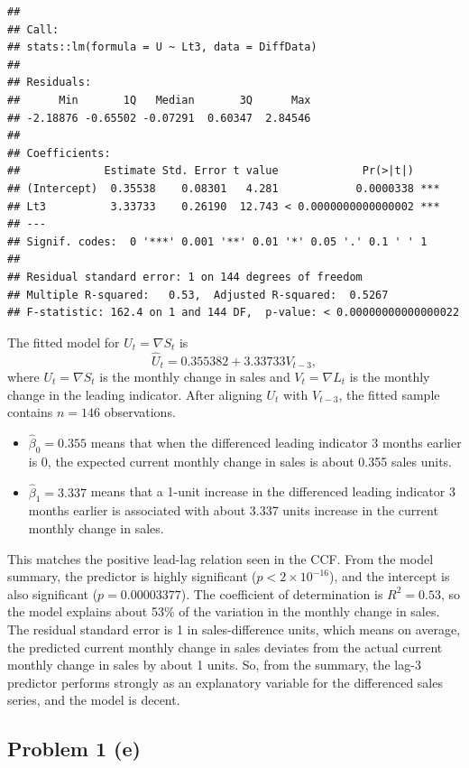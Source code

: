 \documentclass[
  10pt,
]{extarticle}
\providecommand{\tightlist}{%
  \setlength{\itemsep}{0pt}\setlength{\parskip}{0pt}}
\begin{document}
\begin{verbatim}
## 
## Call:
## stats::lm(formula = U ~ Lt3, data = DiffData)
## 
## Residuals:
##      Min       1Q   Median       3Q      Max 
## -2.18876 -0.65502 -0.07291  0.60347  2.84546 
## 
## Coefficients:
##             Estimate Std. Error t value             Pr(>|t|)    
## (Intercept)  0.35538    0.08301   4.281            0.0000338 ***
## Lt3          3.33733    0.26190  12.743 < 0.0000000000000002 ***
## ---
## Signif. codes:  0 '***' 0.001 '**' 0.01 '*' 0.05 '.' 0.1 ' ' 1
## 
## Residual standard error: 1 on 144 degrees of freedom
## Multiple R-squared:   0.53,  Adjusted R-squared:  0.5267 
## F-statistic: 162.4 on 1 and 144 DF,  p-value: < 0.00000000000000022
\end{verbatim}

The fitted model for \(U_t = \nabla S_t\) is
\[
\widehat U_t = 0.355382 + 3.33733 V_{t-3},
\]
where \(U_t = \nabla S_t\) is the monthly change in sales and \(V_t = \nabla L_t\) is the monthly change in the leading indicator. After aligning \(U_t\) with \(V_{t-3}\), the fitted sample contains \(n=146\) observations.

\begin{itemize}
\tightlist
\item
  \(\hat{\beta}_0 = 0.355\) means that when the differenced leading indicator 3 months earlier is 0, the expected current monthly change in sales is about 0.355 sales units.
\item
  \(\hat{\beta}_1 = 3.337\) means that a 1-unit increase in the differenced leading indicator 3 months earlier is associated with about 3.337 units increase in the current monthly change in sales.
\end{itemize}

This matches the positive lead-lag relation seen in the CCF. From the model summary, the predictor is highly significant (\(p < 2 \times 10^{-16}\)), and the intercept is also significant (\(p = 0.00003377\)). The coefficient of determination is \(R^2 = 0.53\), so the model explains about 53\% of the variation in the monthly change in sales. The residual standard error is 1 in sales-difference units, which means on average, the predicted current monthly change in sales deviates from the actual current monthly change in sales by about 1 units. So, from the summary, the lag-3 predictor performs strongly as an explanatory variable for the differenced sales series, and the model is decent.

\newpage

\subsection{Problem 1 (e)}\label{problem-1-e}
\end{document}
